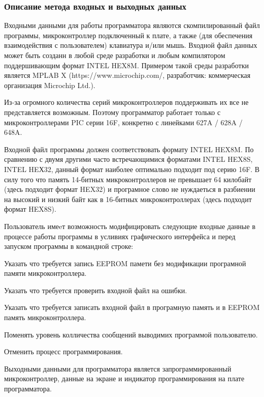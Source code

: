 \subsubsection{Описание метода входных и выходных данных}
Входными данными для работы программатора являются скомпилированный файл программы, микроконтроллер подключенный к плате, а также (для обеспечения взаимодействия с пользователем) клавиатура и/или мышь. Входной файл данных может быть созданн в любой среде разработки и любым компилятором поддершивающим формат INTEL HEX8M. Примером такой среды разработки является MPLAB X (https://www.microchip.com/, разработчик: коммерческая организация Microchip Ltd.).

\begin{my_enumerate}
\item Из-за огромного количества серий микроконтроллеров поддерживать их все не представляется возможным. Поэтому программатор работает только с микроконтроллерами PIC серии 16F, конкретно с линейками 627A / 628A / 648A.
\item Входной файл программы должен соответствовать формату INTEL HEX8M. По сравнению с двумя другими часто встречающимися форматами INTEL HEX8S, INTEL HEХ32, данный формат наиболее оптимально подходит под серию 16F. В силу того что память 14-битных микроконтроллеров не превышает 64 килобайт (здесь подходит формат HEX32) и програмное слово не нуждаеться в разбиении на высокий и низкий байт как в 16-битных микроконтроллерах (здесь подходит формат HEX8S).
\item Пользователь имеeт возможность модифицировать следующие входные данные в процессе работы программы в усливиях графического интерфейса и перед запуском программы в командной строке:
\begin{my_enumerate}
\item Указать что требуется запись EEPROM памети без модификации програмной памяти микроконтроллера.
\item Указать что требуется проверить входной файл на ошибки.
\item Указать что требуется записать входной файл в програмную память и в EEPROM память микроконтроллера.
\item Поменять уровень колличества сообщений выводимих программой пользователю.
\item Отменить процесс программирования.
\end{my_enumerate}
\end{my_enumerate}

\medskip
Выходными данными для программатора является запрограммированный микроконтроллер, данные на экране и индикатор программирования на плате программатора.


